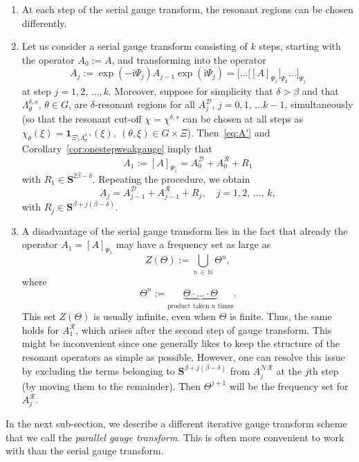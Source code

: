 \documentclass[AHL,Unicode,longabstracts,published]{cedram}
\newcommand{\rmi}{\mathrm{i}}
\newcommand{\N}{\mathbb N}
\newcommand{\CD}{\mathcal{D}}
\newcommand{\CN}{\mathcal{N}}
\newcommand{\CR}{\mathcal{R}}
\newcommand{\CNR}{{\CN\!\CR}}
\newcommand{\bone}{\boldsymbol 1}
\newcommand{\BS}{\mathbf S}
\newcommand{\rco}{\chi}
\newcommand*{\romanenumi}{\renewcommand*{\theenumi}{\roman{enumi}}}
\begin{document}
\begin{rema}\leavevmode
\begin{enumerate}\romanenumi
\item At each step of the serial gauge transform, the resonant regions can be chosen differently.
\item \label{item:consecsameres}
Let us consider a serial gauge transform consisting of $k$ steps, starting with the operator $A_0:=A$, and transforming into the operator
\begin{equation}
A_j:=\exp(-\rmi\Psi_j)A_{j-1}\exp(\rmi\Psi_j)=\big[\dots\big[[A]_{\Psi_1}\big]_{\Psi_2}\dots\big]_{\Psi_j}
\end{equation}
at step $j=1,2,\,\dots, k$. Moreover, suppose for simplicity that $\delta>\beta$ and that $\Lambda_{\theta}^{\delta,s}$, $\theta\in G$, are $\delta$-resonant regions for all $A_j^{\CD}$, $j=0,1,\,\dots k-1$, simultaneously (so that the resonant cut-off $\rco =\rco^{\delta, s}$ can be chosen at all steps as $\rco_\theta(\xi)=\bone_{\Xi\setminus\Lambda_{\theta}^{\delta,s}}(\xi), \ (\theta,\xi)\in G\times\Xi$). Then~\eqref{eq:A'} and Corollary~\ref{cor:onestepweakgauge} imply that
\begin{equation}
A_1:=[A]_{\Psi_1}=A_0^{\CD}+A_0^{\CR}+R_1
\end{equation}
with $R_1\in\BS^{2\beta-\delta}$. Repeating the procedure, we obtain
\begin{equation}
A_j=A_{j-1}^{\CD}+A_{j-1}^{\CR}+R_j,\quad j=1,2,\,\dots,\,k,
\end{equation}
with $R_j\in\BS^{\beta+j(\beta-\delta)}$.
\item A disadvantage of the serial gauge transform lies in the fact that already the operator $A_1=[A]_{\Psi_1}$ may have a frequency set as large as
\begin{equation}\label{eq:ZTheta}
Z(\Theta):= \bigcup_{n\,\in\,\N} \Theta^n,
\end{equation}
where
\begin{equation}
\Theta^n := \underbrace{\Theta \cdot \dotso \cdot \Theta}_{\text{product taken } n \text{ times}}.
\end{equation}
This set $Z(\Theta)$ is usually infinite, even when $\Theta$ is finite. Thus, the same holds for $A_1^{\CR}$, which arises after the second step of gauge transform. This might be inconvenient since one generally likes to keep the structure of the resonant operators as simple as possible. However, one can resolve this issue by excluding the terms belonging to $\BS^{\beta+j(\beta-\delta)}$ from $A_j^{\CNR}$ at the $j$th step (by moving them to the remainder). Then $\Theta^{j+1}$ will be the frequency set for $A_j^{\CR}$.
\end{enumerate}
\end{rema}
In the next sub-section, we describe a different iterative gauge transform scheme that we call the \emph{parallel gauge transform}. This is often more convenient to work with than the serial gauge transform.
\end{document}
